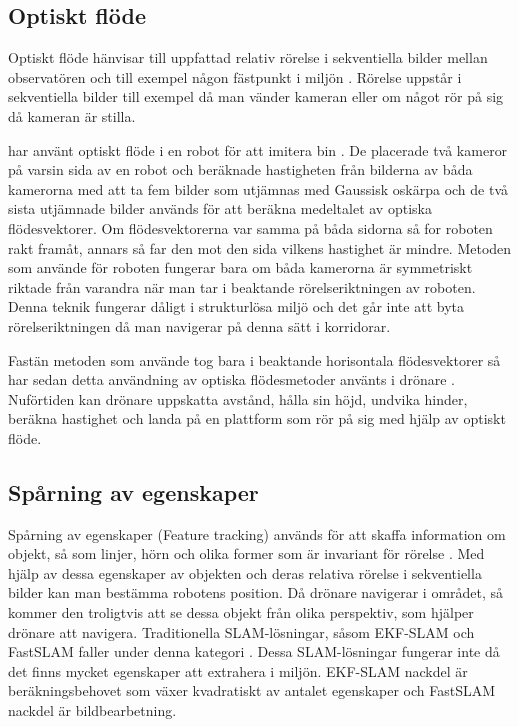 \subsection{Optiskt flöde}

Optiskt flöde hänvisar till uppfattad relativ rörelse i sekventiella bilder mellan observatören och till exempel någon fästpunkt i miljön \citep{opticalflowuav}. Rörelse uppstår i sekventiella bilder till exempel då man vänder kameran eller om något rör på sig då kameran är stilla. 

\cite{341094} har använt optiskt flöde i en robot för att imitera bin \citep{341094}. De placerade två kameror på varsin sida av en robot och beräknade hastigheten från bilderna av båda kamerorna med att ta fem bilder som utjämnas med Gaussisk oskärpa och de två sista utjämnade bilder används för att beräkna medeltalet av optiska flödesvektorer. Om flödesvektorerna var samma på båda sidorna så for roboten rakt framåt, annars så far den mot den sida vilkens hastighet är mindre. Metoden som \cite{341094} använde för roboten fungerar bara om båda kamerorna är symmetriskt riktade från varandra när man tar i beaktande rörelseriktningen av roboten. Denna teknik fungerar dåligt i strukturlösa miljö och det går inte att byta rörelseriktningen då man navigerar på denna sätt i korridorar. 

Fastän metoden som \cite{341094} använde tog bara i beaktande horisontala flödesvektorer så har sedan detta användning av optiska flödesmetoder använts i drönare \citep{6564752}. Nuförtiden kan drönare uppskatta avstånd, hålla sin höjd, undvika hinder, beräkna hastighet och landa på en plattform som rör på sig med hjälp av optiskt flöde.

\subsection{Spårning av egenskaper}

Spårning av egenskaper (Feature tracking) används för att skaffa information om objekt, så som linjer, hörn och olika former som är invariant för rörelse \citep{geospatial}. Med hjälp av dessa egenskaper av objekten och deras relativa rörelse i sekventiella bilder kan man bestämma robotens position. Då drönare navigerar i området, så kommer den troligtvis att se dessa objekt från olika perspektiv, som hjälper drönare att navigera. Traditionella SLAM-lösningar, såsom EKF-SLAM och FastSLAM faller under denna kategori \citep{voslamlatif}. Dessa SLAM-lösningar fungerar inte då det finns mycket egenskaper att extrahera i miljön. EKF-SLAM nackdel är beräkningsbehovet som växer kvadratiskt av antalet egenskaper och FastSLAM nackdel är bildbearbetning.

